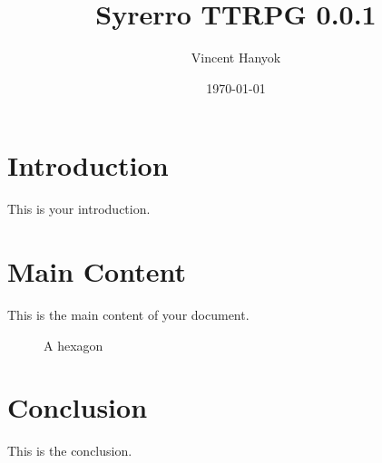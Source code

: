 \documentclass{article}
\title{Syrerro TTRPG 0.0.1}
\author{Vincent Hanyok}
\date{\today}
\begin{document}
\maketitle

\section{Introduction}
This is your introduction.

\section{Main Content}
This is the main content of your document.

\begin{figure}[h!]
    \centering
    \caption{A hexagon}
\end{figure}

\section{Conclusion}
This is the conclusion.
\end{document}
